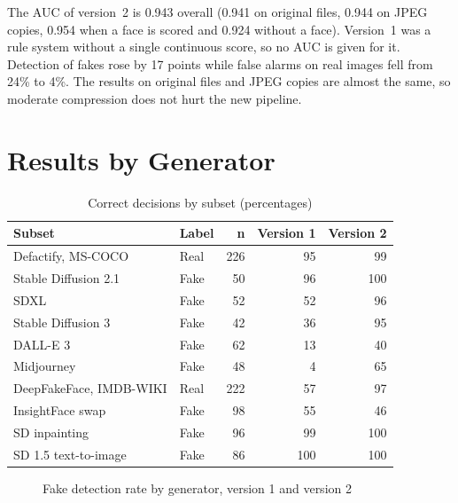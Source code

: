 \documentclass[12pt,a4paper,oneside]{report}
\begin{document}
The AUC of version~2 is 0.943 overall (0.941 on original files, 0.944 on JPEG copies, 0.954 when a face is scored and 0.924 without a face). Version~1 was a rule system without a single continuous score, so no AUC is given for it. Detection of fakes rose by 17 points while false alarms on real images fell from 24\% to 4\%. The results on original files and JPEG copies are almost the same, so moderate compression does not hurt the new pipeline.

\section{Results by Generator}
\begin{table}[H]
\centering
\caption{Correct decisions by subset (percentages)}\label{tab:subset}
\begin{tabular}{@{}llrrr@{}}
\toprule
Subset & Label & n & Version 1 & Version 2 \\
\midrule
Defactify, MS-COCO & Real & 226 & 95 & 99 \\
Stable Diffusion 2.1 & Fake & 50 & 96 & 100 \\
SDXL & Fake & 52 & 52 & 96 \\
Stable Diffusion 3 & Fake & 42 & 36 & 95 \\
DALL-E 3 & Fake & 62 & 13 & 40 \\
Midjourney & Fake & 48 & 4 & 65 \\
DeepFakeFace, IMDB-WIKI & Real & 222 & 57 & 97 \\
InsightFace swap & Fake & 98 & 55 & 46 \\
SD inpainting & Fake & 96 & 99 & 100 \\
SD 1.5 text-to-image & Fake & 86 & 100 & 100 \\
\bottomrule
\end{tabular}
\end{table}

\begin{figure}[H]
\centering
{}
\caption{Fake detection rate by generator, version 1 and version 2}\label{fig:subset}
\end{figure}
\end{document}
